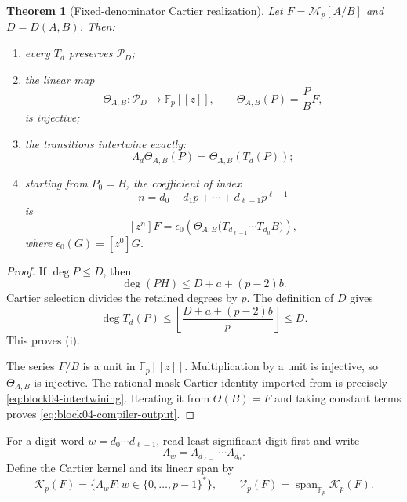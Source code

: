 \documentclass[11pt]{article}
\newtheorem{theorem}{Theorem}[section]
\theoremstyle{definition}
\theoremstyle{remark}
\begin{document}
\begin{theorem}[Fixed-denominator Cartier realization]
\label{thm:fixed-denominator-cartier-realization}
Let \(F=\mathcal M_p[A/B]\) and \(D=D(A,B)\).  Then:
\begin{enumerate}[label=\textup{(\roman*)}]
\item every \(T_d\) preserves \(\mathcal P_D\);
\item the linear map
\begin{equation}
\label{eq:block04-theta-map}
\Theta_{A,B}:\mathcal P_D\longrightarrow\mathbb F_p[[z]],
\qquad
\Theta_{A,B}(P)=\frac{P}{B}F,
\end{equation}
is injective;
\item the transitions intertwine exactly:
\begin{equation}
\label{eq:block04-intertwining}
\Lambda_d\Theta_{A,B}(P)
=
\Theta_{A,B}(T_d(P));
\end{equation}
\item starting from \(P_0=B\), the coefficient of index
\[
n=d_0+d_1p+\cdots+d_{\ell-1}p^{\ell-1}
\]
is
\begin{equation}
\label{eq:block04-compiler-output}
[z^n]F
=
\epsilon_0\!\left(
\Theta_{A,B}
\bigl(T_{d_{\ell-1}}\cdots T_{d_0}B\bigr)
\right),
\end{equation}
where \(\epsilon_0(G)=[z^0]G\).
\end{enumerate}
\end{theorem}

\begin{proof}
If \(\deg P\leq D\), then
\[
\deg(PH)
\leq
D+a+(p-2)b.
\]
Cartier selection divides the retained degrees by \(p\).  The definition of \(D\) gives
\[
\deg T_d(P)
\leq
\left\lfloor\frac{D+a+(p-2)b}{p}\right\rfloor
\leq D.
\]
This proves (i).

The series \(F/B\) is a unit in \(\mathbb F_p[[z]]\).  Multiplication by a unit is injective, so \(\Theta_{A,B}\) is injective.  The rational-mask Cartier identity imported from \cite{FMH} is precisely \cref{eq:block04-intertwining}.  Iterating it from \(\Theta(B)=F\) and taking constant terms proves \cref{eq:block04-compiler-output}.
\end{proof}

For a digit word \(w=d_0\cdots d_{\ell-1}\), read least significant digit first and write
\[
\Lambda_w
=
\Lambda_{d_{\ell-1}}\cdots\Lambda_{d_0}.
\]
Define the Cartier kernel and its linear span by
\begin{equation}
\label{eq:block04-kernel-span}
\mathcal K_p(F)
=
\{\Lambda_wF:w\in\{0,\ldots,p-1\}^{*}\},
\qquad
\mathcal V_p(F)
=
\operatorname{span}_{\mathbb F_p}\mathcal K_p(F).
\end{equation}
\end{document}

